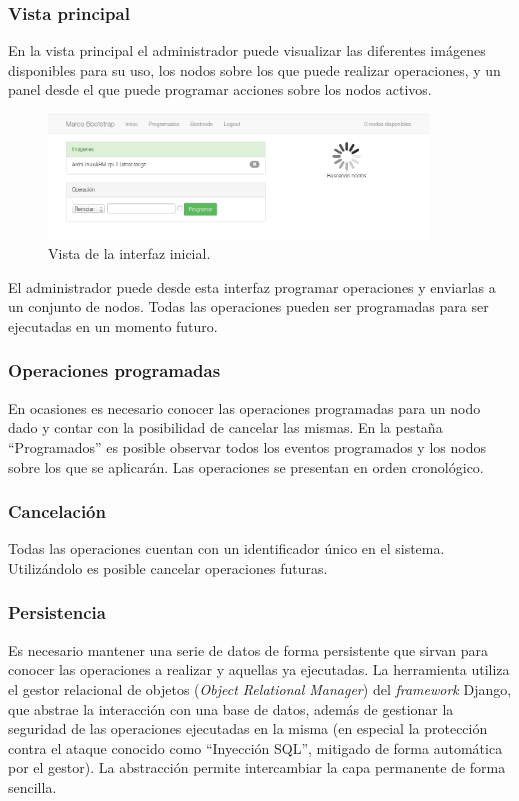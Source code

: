 \documentclass{article}
\begin{document}
\subsubsection{Vista principal}

En la vista principal el administrador puede visualizar las diferentes imágenes disponibles para su uso, los nodos sobre los que puede realizar operaciones, y un panel desde el que puede programar acciones sobre los nodos activos.

\begin{figure}[H]
\centering
\includegraphics[width=0.9\textwidth]{index}
\caption{Vista de la interfaz inicial.}
\label{backend:index}
\end{figure}

El administrador puede desde esta interfaz programar operaciones y enviarlas a un conjunto de nodos. Todas las operaciones pueden ser programadas para ser ejecutadas en un momento futuro.

\subsubsection{Operaciones programadas}

En ocasiones es necesario conocer las operaciones programadas para un nodo dado y contar con la posibilidad de cancelar las mismas. En la pestaña ``Programados'' es posible observar todos los eventos programados y los nodos sobre los que se aplicarán. Las operaciones se presentan en orden cronológico.
\subsubsection{Cancelación}

Todas las operaciones cuentan con un identificador único en el sistema. Utilizándolo es posible cancelar operaciones futuras.

\subsubsection{Persistencia}

Es necesario mantener una serie de datos de forma persistente que sirvan para conocer las operaciones a realizar y aquellas ya ejecutadas. La herramienta utiliza el gestor relacional de objetos (\textit{Object Relational Manager}) del \textit{framework} Django, que abstrae la interacción con una base de datos, además de gestionar la seguridad de las operaciones ejecutadas en la misma (en especial la protección contra el ataque conocido como ``Inyección SQL'', mitigado de forma automática por el gestor). La abstracción permite intercambiar la capa permanente de forma sencilla.
\end{document}
